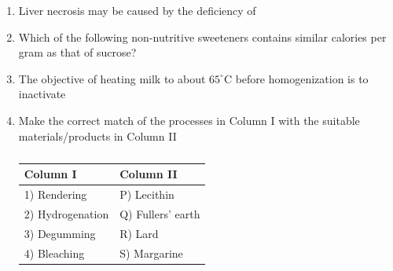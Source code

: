 \documentclass[a4paper,10pt]{article}
\begin{document}
\begin{enumerate}
    \item Liver necrosis may be caused by the deficiency of
    
    \hfill{}
    \begin{enumerate}
    \end{enumerate}
    
    \item Which of the following non-nutritive sweeteners contains similar calories per gram as that of sucrose?
    
    \hfill{}
    \begin{enumerate}
    \end{enumerate}
    
    \item The objective of heating milk to about $65^\circ$C before homogenization is to inactivate
    
    \hfill{}
    \begin{enumerate}
    \end{enumerate}
    
    \item Make the correct match of the processes in Column I with the suitable materials/products in Column II
    \begin{table}[h!] \centering \caption*{} \label{tab:q7_food}
        \begin{tabular}{ll} \hline
            \textbf{Column I} & \textbf{Column II} \\ \hline
            1) Rendering & P) Lecithin \\
            2) Hydrogenation & Q) Fullers' earth \\
            3) Degumming & R) Lard \\
            4) Bleaching & S) Margarine \\ \hline
        \end{tabular}
    \end{table}
    

\end{enumerate}
\end{document}
